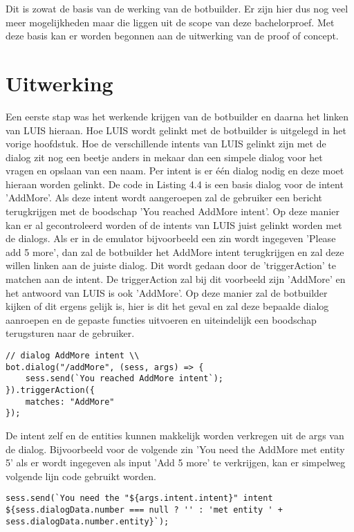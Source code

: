 Dit is zowat de basis van de werking van de botbuilder. Er zijn hier dus nog veel meer mogelijkheden maar die liggen uit de scope van deze bachelorproef. Met deze basis kan er worden begonnen aan de uitwerking van de proof of concept.

\section{Uitwerking}
\label{sec:Uitwerking}

Een eerste stap was het werkende krijgen van de botbuilder en daarna het linken van LUIS hieraan. Hoe LUIS wordt gelinkt met de botbuilder is uitgelegd in het vorige hoofdstuk. Hoe de verschillende intents van LUIS gelinkt zijn met de dialog zit nog een beetje anders in mekaar dan een simpele dialog voor het vragen en opslaan van een naam. Per intent is er één dialog nodig en deze moet hieraan worden gelinkt. De code in Listing 4.4 is een basis dialog voor de intent 'AddMore'. Als deze intent wordt aangeroepen zal de gebruiker een bericht terugkrijgen met de boodschap 'You reached AddMore intent'. Op deze manier kan er al gecontroleerd worden of de intents van LUIS juist gelinkt worden met de dialogs. Als er in de emulator bijvoorbeeld een zin wordt ingegeven 'Please add 5 more', dan zal de botbuilder het AddMore intent terugkrijgen en zal deze willen linken aan de juiste dialog. Dit wordt gedaan door de 'triggerAction' te matchen aan de intent. De triggerAction zal bij dit voorbeeld zijn 'AddMore' en het antwoord van LUIS is ook 'AddMore'. Op deze manier zal de botbuilder kijken of dit ergens gelijk is, hier is dit het geval en zal deze bepaalde dialog aanroepen en de gepaste functies uitvoeren en uiteindelijk een boodschap terugsturen naar de gebruiker.

\medskip
\begin{lstlisting}[caption=Dialog]
// dialog AddMore intent \\
bot.dialog("/addMore", (sess, args) => {
	sess.send(`You reached AddMore intent`);
}).triggerAction({
	matches: "AddMore"
});
\end{lstlisting}

De intent zelf en de entities kunnen makkelijk worden verkregen uit de args van de dialog. Bijvoorbeeld voor de volgende zin 'You need the AddMore met entity 5' als er wordt ingegeven als input 'Add 5 more' te verkrijgen, kan er simpelweg volgende lijn code gebruikt worden.

\medskip
\begin{lstlisting}[caption=Gebruiken van args]
sess.send(`You need the "${args.intent.intent}" intent ${sess.dialogData.number === null ? '' : 'met entity ' + sess.dialogData.number.entity}`);
\end{lstlisting}

